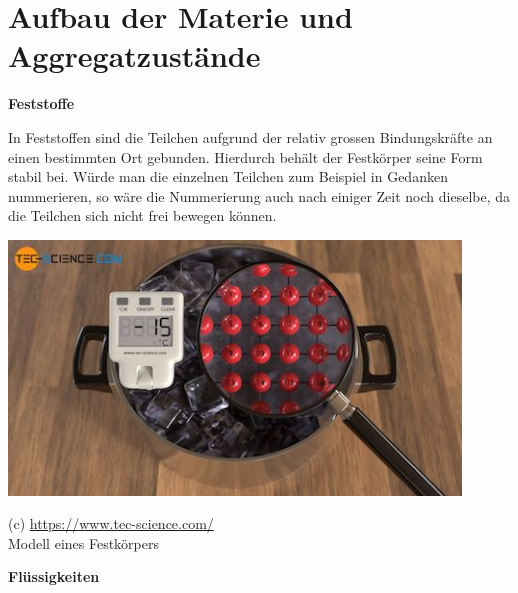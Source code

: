\documentclass[11pt]{article}
\begin{document}
\section*{Aufbau der Materie und Aggregatzustände}

\textbf{Feststoffe}

\begin{minipage}{0.65\textwidth}

In Feststoffen sind die Teilchen aufgrund der relativ grossen Bindungskräfte an einen bestimmten Ort gebunden. Hierdurch behält der Festkörper seine Form stabil bei. Würde man die einzelnen Teilchen zum Beispiel in Gedanken nummerieren, so wäre die Nummerierung auch nach einiger Zeit noch dieselbe, da die Teilchen sich nicht frei bewegen können.
\vspace{1.5cm}
\end{minipage}
\begin{minipage}{0.32\textwidth}
    \begin{flushright}
        \includegraphics[trim=6.5cm 2.5cm 3.5cm 0.5cm, clip, width=0.9\textwidth]{images/aggregatzustand-fest.jpg}
    \end{flushright}
    {\scriptsize (c) \url{https://www.tec-science.com/}}\\
    {\scriptsize Modell eines Festkörpers}
\end{minipage}


\textbf{Flüssigkeiten}
\end{document}
